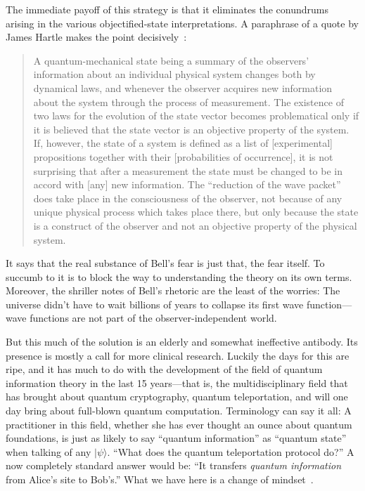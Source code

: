 The immediate payoff of this strategy is that it eliminates the conundrums arising in the various objectified-state interpretations.  A paraphrase of a quote by James Hartle makes the point decisively~\cite{Hartle68}:
\begin{quotation}\small
A quantum-mechanical state being a summary of the observers' information about an individual physical system changes both by
dynamical laws, and whenever the observer acquires new information about the system through the process of measurement.  The existence
of two laws for the evolution of the state vector becomes problematical only if it is believed that the state vector is an objective property of the system.   If, however, the state of a system is defined as a list of [experimental] propositions together with their [probabilities of occurrence], it is not surprising that after a measurement the state must be changed to be in accord with [any] new information.  The ``reduction of the wave packet'' does take place in the consciousness of the observer, not because of any unique physical process which takes place there, but only because the state is a construct of the observer and not an objective property of the physical system.
\end{quotation}
It says that the real substance of Bell's fear is just that, the fear itself.  To succumb to it is to block the way to understanding the theory on its own terms.  Moreover, the shriller notes of Bell's rhetoric are the least of the worries:  The universe didn't have to wait billions of years to collapse its first wave function---wave functions are not part of the observer-independent world.

But this much of the solution is an elderly and somewhat ineffective antibody.  Its presence is mostly a call for more clinical research.  Luckily the days for this are ripe, and it has much to do with the development of the field of quantum information theory in the last 15 years---that is, the multidisciplinary field that has brought about quantum cryptography, quantum teleportation, and will one day bring about full-blown quantum computation.  Terminology can say it all:  A practitioner in this field, whether she has ever thought an ounce about quantum foundations, is just as likely to say ``quantum information'' as ``quantum state'' when talking of any $|\psi\rangle$.  ``What does the quantum teleportation protocol do?''  A now completely standard answer would be: ``It transfers {\it quantum information\/} from Alice's site to Bob's.''  What we have here is a change of mindset~\cite{Fuchs10}.

